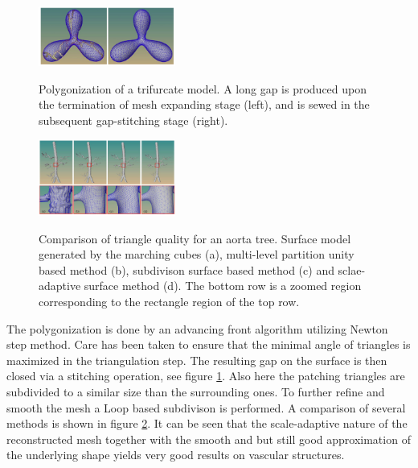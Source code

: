 \begin{figure}[h]
	\centering
	\includegraphics[width=0.4\textwidth]{./Images/Polygonization.png} \\
	\caption{Polygonization of a trifurcate model. A long gap is produced upon the termination of mesh
		expanding stage (left), and is sewed in the subsequent gap-stitching stage (right).}
	\cite{wu2010scale}
	\label{fig:Polygonization}
\end{figure} 

\begin{figure}[h]
	\centering
	\includegraphics[width=0.4\textwidth]{./Images/TriangleQuality.png} \\
	\caption{ Comparison of triangle quality for an aorta tree. Surface model generated by the marching cubes (a),
		multi-level partition unity based method (b), subdivison surface based method (c) and sclae-adaptive surface method (d). The bottom row is a zoomed region corresponding to the rectangle region of the top row.}
	\cite{wu2010scale}
	\label{fig:TriangleQuality}
\end{figure} 

The polygonization is done by an advancing front algorithm utilizing Newton step method. Care has been taken to ensure that the minimal angle of triangles is maximized in the triangulation step. The resulting gap on the surface is then closed via a stitching operation, see figure \ref{fig:Polygonization}. Also here the patching triangles are subdivided to a similar size than the surrounding ones. To further refine and smooth the mesh a Loop based subdivison is performed.
A comparison of several methods is shown in figure \ref{fig:TriangleQuality}. It can be seen that the scale-adaptive nature of the reconstructed mesh together with the smooth and but still good approximation of the underlying shape yields very good results on vascular structures. 
